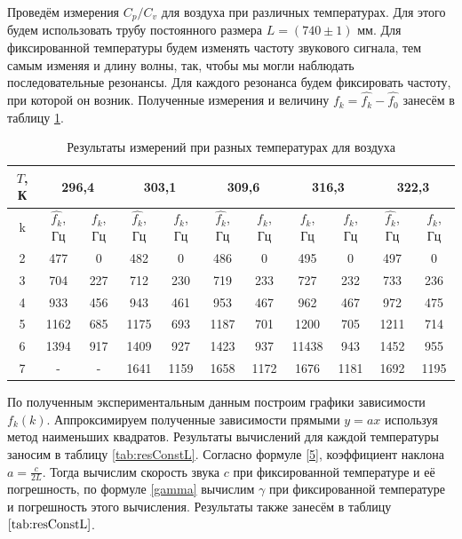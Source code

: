 \documentclass[12pt,a4paper]{article}
\begin{document}
Проведём измерения $ C_p/C_v $ для воздуха при различных температурах. Для этого будем использовать трубу постоянного размера $ L = (740 \pm 1) $ мм. Для фиксированной температуры будем изменять частоту звукового сигнала, тем самым изменяя и длину волны, так, чтобы мы могли наблюдать последовательные резонансы. Для каждого резонанса будем фиксировать частоту, при которой он возник. Полученные измерения и величину $ f_k = \hat{f_k} - \hat{f_0} $ занесём в таблицу \ref{tab:constL}.

\begin{table}[!h]
	\centering
	\begin{tabular}{|c|c|c|c|c|c|c|c|c|c|c|}
		\hline
		$ T $, К & \multicolumn{2}{c|}{296,4} & \multicolumn{2}{c|}{303,1} & \multicolumn{2}{c|}{309,6} & \multicolumn{2}{c|}{316,3} & \multicolumn{2}{c|}{322,3} \\ \hline
		k & $ \hat{f_k} $, Гц & $ f_k $, Гц & $ \hat{f_k} $, Гц & $ f_k $, Гц & $ \hat{f_k} $, Гц & $ f_k $, Гц & $ \hat{f_k} $, Гц & $ f_k $, Гц & $ \hat{f_k} $, Гц & $ f_k $, Гц \\ \hline
	    2 & 477 &  0  & 482 & 0 & 486 & 0 & 495 & 0 & 497 & 0 \\ \hline
		3 & 704 & 227 & 712 & 230 & 719 & 233 & 727 & 232 & 733 & 236\\ \hline
		4 & 933 & 456 & 943 & 461 & 953 & 467 & 962 & 467 & 972 & 475 \\ \hline
		5 & 1162 & 685 & 1175 & 693 & 1187 & 701 & 1200 & 705 & 1211 & 714 \\ \hline
		6 & 1394 & 917 & 1409 & 927 & 1423 & 937 & 11438 & 943 & 1452 & 955 \\ \hline
		7 & - & - & 1641 & 1159 & 1658 & 1172 & 1676 & 1181 & 1692 & 1195 \\ \hline
	\end{tabular}
	\caption{Результаты измерений при разных температурах для воздуха}
	\label{tab:constL}
\end{table}
По полученным экспериментальным данным построим графики зависимости $ f_k(k) $.
Аппроксимируем полученные зависимости прямыми $ y=ax $ используя метод наименьших квадратов. Результаты вычислений для каждой температуры заносим в таблицу \ref{tab:resConstL}. Согласно формуле \eqref{5}, коэффициент наклона $ \displaystyle a = \frac{c}{2L}$. Тогда вычислим скорость звука $ c $ при фиксированной температуре и её погрешность, по формуле \eqref{gamma} вычислим $ \gamma $ при фиксированной температуре и погрешность этого вычисления. Результаты также занесём в таблицу $ \ref{tab:resConstL} $.
\newpage
\end{document}
